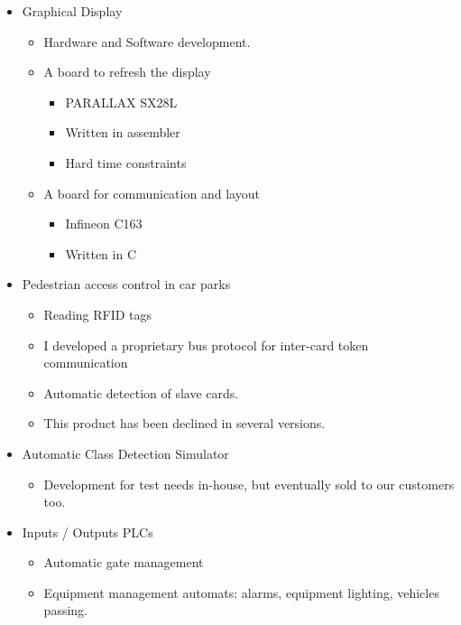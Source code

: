 \documentclass[11pt,a4paper,sans]{moderncv}   %
\begin{document}
{\begin{itemize}
\begin{itemize}
    \item This display is available in many specific versions.
  \end{itemize}
 \item Graphical Display
  \begin{itemize}
   \item Hardware and Software development.
   \item A board to refresh the display
    \begin{itemize}
     \item PARALLAX SX28L
     \item Written in assembler
     \item Hard time constraints
    \end{itemize}
   \item A board for communication and layout
    \begin{itemize}
     \item Infineon C163
     \item Written in C
    \end{itemize}
  \end{itemize}
 \item Pedestrian access control in car parks
  \begin{itemize}
    \item Reading RFID tags
    \item I developed a proprietary bus protocol for inter-card token communication
    \item Automatic detection of slave cards.
    \item This product has been declined in several versions.
   \end{itemize}
 \item Automatic Class Detection Simulator
  \begin{itemize}
   \item Development for test needs in-house, but eventually sold to our customers too.
  \end{itemize}
 \item Inputs / Outputs PLCs
  \begin{itemize}
   \item Automatic gate management
   \item Equipment management automats: alarms, equipment lighting, vehicles passing.
  \end{itemize}
\end{itemize}}
\end{document}
